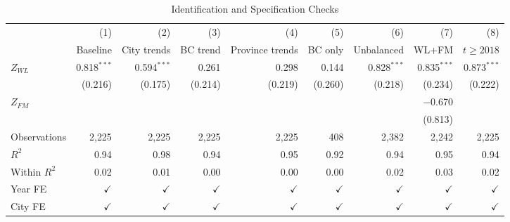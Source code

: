 \documentclass[12pt]{article}
\begin{document}
\begin{landscape}
\begin{table}[htbp]
  \caption{Identification and Specification Checks}
  \label{tab:robustness_identification}
  \centering\small
  \begin{threeparttable}
    \begin{tabular}{lrrrrrrrr}
      \toprule
                                    & (1)           & (2)           & (3)          & (4)          & (5)      & (6)           & (7)           & (8)           \\
                                    & Baseline      & City trends   & BC trend     & Province trends& BC only  & Unbalanced    & WL+FM         & $t\geq 2018$  \\
      \midrule
      $Z_{WL}$                       & 0.818$^{***}$ & 0.594$^{***}$ & 0.261        & 0.298        & 0.144    & 0.828$^{***}$ & 0.835$^{***}$ & 0.873$^{***}$ \\
                                    & (0.216)       & (0.175)       & (0.214)      & (0.219)      & (0.260)  & (0.218)       & (0.234)       & (0.222)       \\[4pt]
      $Z_{FM}$                       &               &               &              &              &          &               & $-$0.670      &               \\
                                    &               &               &              &              &          &               & (0.813)       &               \\
      \midrule
      Observations   & 2{,}225      & 2{,}225       & 2{,}225      & 2{,}225      & 408      & 2{,}382       & 2{,}242       & 2{,}225       \\
      $R^{2}$        & 0.94         & 0.98          & 0.94         & 0.95         & 0.92     & 0.94          & 0.95          & 0.94          \\
      Within $R^{2}$ & 0.02         & 0.01          & 0.00         & 0.00         & 0.00     & 0.02          & 0.03          & 0.02          \\
      \midrule
      Year FE        & $\checkmark$ & $\checkmark$  & $\checkmark$ & $\checkmark$ & $\checkmark$ & $\checkmark$ & $\checkmark$ & $\checkmark$ \\
      City FE        & $\checkmark$ & $\checkmark$  & $\checkmark$ & $\checkmark$ & $\checkmark$ & $\checkmark$ & $\checkmark$ & $\checkmark$ \\

\end{tabular}
\end{threeparttable}
\end{table}
\end{landscape}
\end{document}

